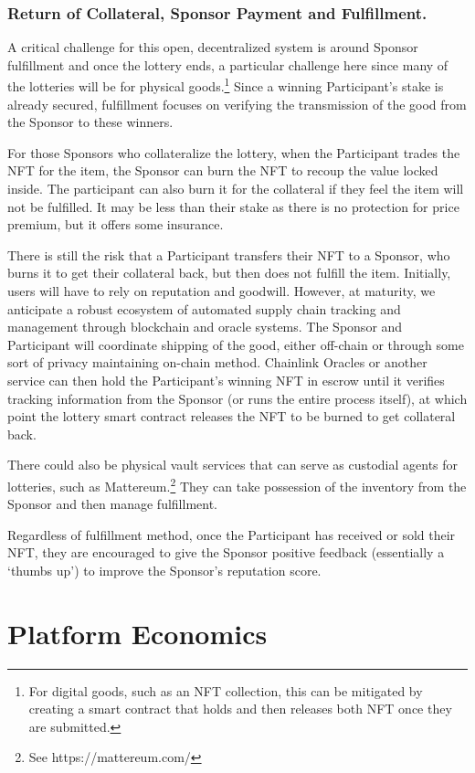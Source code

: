 \documentclass[runningheads]{llncs}
\begin{document}
\subsubsection{Return of Collateral, Sponsor Payment and Fulfillment.}  A critical challenge for this open, decentralized system is around Sponsor fulfillment and once the lottery ends, a particular challenge here since many of the lotteries will be for physical goods.\footnote{For digital goods, such as an NFT collection, this can be mitigated by creating a smart contract that holds and then releases both NFT once they are submitted.}   Since a winning Participant’s stake is already secured, fulfillment focuses on verifying the transmission of the good from the Sponsor to these winners.

For those Sponsors who collateralize the lottery, when the Participant trades the NFT for the item, the Sponsor can burn the NFT to recoup the value locked inside.  The participant can also burn it for the collateral if they feel the item will not be fulfilled.  It may be less than their stake as there is no protection for price premium, but it offers some insurance.  

There is still the risk that a Participant transfers their NFT to a Sponsor, who burns it to get their collateral back, but then does not fulfill the item.  Initially, users will have to rely on reputation and goodwill.  However, at maturity, we anticipate a robust ecosystem of automated supply chain tracking and management through blockchain and oracle systems.  The Sponsor and Participant will coordinate shipping of the good, either off-chain or through some sort of privacy maintaining on-chain method.  Chainlink Oracles or another service can then hold the Participant’s winning NFT in escrow until it verifies tracking information from the Sponsor (or runs the entire process itself), at which point the lottery smart contract releases the NFT to be burned to get collateral back.

There could also be physical vault services that can serve as custodial agents for lotteries, such as Mattereum.\footnote{See https://mattereum.com/}  They can take possession of the inventory from the Sponsor and then manage fulfillment.

Regardless of fulfillment method, once the Participant has received or sold their NFT, they are encouraged to give the Sponsor positive feedback (essentially a ‘thumbs up’) to improve the Sponsor’s reputation score.


\section{Platform Economics}\label{section-PlatformEconomics}
\end{document}
